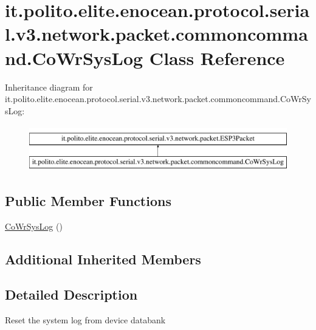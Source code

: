 \hypertarget{classit_1_1polito_1_1elite_1_1enocean_1_1protocol_1_1serial_1_1v3_1_1network_1_1packet_1_1commoncommand_1_1_co_wr_sys_log}{}\section{it.\+polito.\+elite.\+enocean.\+protocol.\+serial.\+v3.\+network.\+packet.\+commoncommand.\+Co\+Wr\+Sys\+Log Class Reference}
\label{classit_1_1polito_1_1elite_1_1enocean_1_1protocol_1_1serial_1_1v3_1_1network_1_1packet_1_1commoncommand_1_1_co_wr_sys_log}
Inheritance diagram for it.\+polito.\+elite.\+enocean.\+protocol.\+serial.\+v3.\+network.\+packet.\+commoncommand.\+Co\+Wr\+Sys\+Log\+:\begin{figure}[H]
\begin{center}
\leavevmode
\includegraphics[height=2.000000cm]{classit_1_1polito_1_1elite_1_1enocean_1_1protocol_1_1serial_1_1v3_1_1network_1_1packet_1_1commoncommand_1_1_co_wr_sys_log}
\end{center}
\end{figure}
\subsection*{Public Member Functions}
\begin{DoxyCompactItemize}
\item 
\hyperlink{classit_1_1polito_1_1elite_1_1enocean_1_1protocol_1_1serial_1_1v3_1_1network_1_1packet_1_1commoncommand_1_1_co_wr_sys_log_a450d9e0ddb62c5766bbcd1be27ea032b}{Co\+Wr\+Sys\+Log} ()
\end{DoxyCompactItemize}
\subsection*{Additional Inherited Members}


\subsection{Detailed Description}
Reset the system log from device databank

